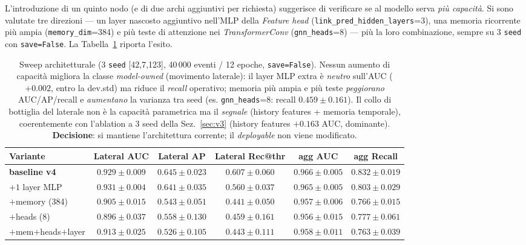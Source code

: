 \documentclass[11pt,a4paper]{report}
\begin{document}
L'introduzione di un quinto nodo (e di due archi aggiuntivi per richiesta) suggerisce di verificare se al modello serva \emph{più capacità}. Si sono valutate tre direzioni — un layer nascosto aggiuntivo nell'MLP della \textit{Feature head} (\texttt{link\_pred\_hidden\_layers}=3), una memoria ricorrente più ampia (\texttt{memory\_dim}=384) e più teste di attenzione nei \textit{TransformerConv} (\texttt{gnn\_heads}=8) — più la loro combinazione, sempre su 3 \texttt{seed} con \texttt{save=False}. La Tabella~\ref{tab:archsweep} riporta l'esito.

\begin{table}[ht!]
\centering
\footnotesize
\renewcommand{\arraystretch}{1.4}
\setlength{\tabcolsep}{5pt}
\begin{tabular}{l c c c c c}
\hline
\textbf{Variante} & \textbf{Lateral AUC} & \textbf{Lateral AP} & \textbf{Lateral Rec@thr} & \textbf{agg AUC} & \textbf{agg Recall} \\
\hline
\textbf{baseline v4}     & $0.929\pm0.009$ & $\mathbf{0.645}\pm0.023$ & $\mathbf{0.607}\pm0.060$ & $\mathbf{0.966}\pm0.005$ & $\mathbf{0.832}\pm0.019$ \\
$+1$ layer MLP           & $0.931\pm0.004$ & $0.641\pm0.035$ & $0.560\pm0.037$ & $0.965\pm0.005$ & $0.803\pm0.029$ \\
$+$memory (384)          & $0.905\pm0.015$ & $0.543\pm0.051$ & $0.441\pm0.050$ & $0.957\pm0.006$ & $0.766\pm0.015$ \\
$+$heads (8)             & $0.896\pm0.037$ & $0.558\pm0.130$ & $0.459\pm0.161$ & $0.956\pm0.015$ & $0.777\pm0.061$ \\
$+$mem$+$heads$+$layer    & $0.913\pm0.025$ & $0.526\pm0.105$ & $0.443\pm0.111$ & $0.958\pm0.011$ & $0.763\pm0.039$ \\
\hline
\end{tabular}
\caption{Sweep architetturale (3 \texttt{seed} [42,7,123], 40\,000 eventi / 12 epoche, \texttt{save=False}). Nessun aumento di capacità migliora la classe \textit{model-owned} (movimento laterale): il layer MLP extra è \emph{neutro} sull'AUC ($+0.002$, entro la dev.std) ma riduce il \textit{recall} operativo; memoria più ampia e più teste \emph{peggiorano} AUC/AP/recall e \emph{aumentano} la varianza tra seed (es. \texttt{gnn\_heads}=8: recall $0.459\pm0.161$). Il collo di bottiglia del laterale non è la capacità parametrica ma il \emph{segnale} (history features + memoria temporale), coerentemente con l'ablation a 3 seed della Sez.~\ref{sec:v3} (history features $+0.163$ AUC, dominante). \textbf{Decisione}: si mantiene l'architettura corrente; il \textit{deployable} non viene modificato.}
\label{tab:archsweep}
\end{table}
\end{document}
